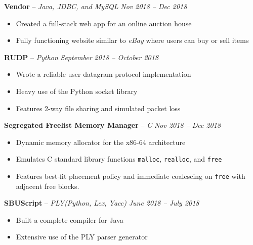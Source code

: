 \documentclass[10pt,letterpaper]{article}
\begin{document}
										
\headedsection 
{\textbf{Vendor} -- \textit{Java, JDBC, and MySQL}}
{\textit{Nov 2018 -- Dec 2018}} {
	\begin{itemize}[noitemsep,nolistsep]
		\item Created a full-stack web app for an online auction house
		\item Fully functioning website similar to \textit{eBay} where users can buy or sell items
	\end{itemize}
}

										
\headedsection 
{\textbf{RUDP} -- \textit{Python}}
{\textit{September 2018 -- October 2018}} {
	\begin{itemize}[noitemsep,nolistsep]
		\item Wrote a reliable user datagram protocol implementation
		\item Heavy use of the Python socket library
		\item Features 2-way file sharing and simulated packet loss
	\end{itemize}
}	


\headedsection 
{\textbf{Segregated Freelist Memory Manager} -- \textit{C}}
{\textit{Nov 2018 -- Dec 2018}} {
	\begin{itemize}[noitemsep,nolistsep]
		\item Dynamic memory allocator for the x86-64 architecture
		\item Emulates C standard library functions \texttt{malloc}, \texttt{realloc}, and \texttt{free}
		\item Features best-fit placement policy and immediate coalescing on \texttt{free} with adjacent free blocks.	      		      		      		      		
	\end{itemize}
}
										

\headedsection 
{\textbf{SBUScript} -- \textit{PLY(Python, Lex, Yacc)}}
{\textit{June 2018 -- July 2018}} {
	\begin{itemize}[noitemsep,nolistsep]
		\item Built a complete compiler for Java
		\item Extensive use of the PLY parser generator
	\end{itemize}
}
										
\end{document}
